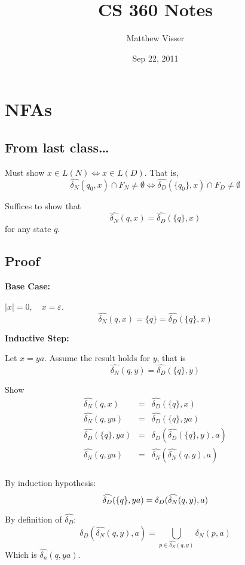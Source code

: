 \documentclass[12pt]{article}
\begin{document}
\renewcommand{\hat}{\widehat}

\title{CS 360 Notes}
\author{Matthew Visser}
\date{Sep 22, 2011}
\maketitle

\section{NFAs}
\subsection{From last class\dots}

Must show $x \in L(N) \iff x \in L(D)$. That is,
\[
\hat{\delta_N}(q_0,x)\cap F_N \neq \emptyset \iff \hat{\delta_D}(\{q_0\},x)\cap
F_D \neq \emptyset 
\]

Suffices to show that
\[
\hat{\delta_N}(q,x) = \hat{\delta_D}(\{q\},x)
\]
for any state $q$.

\subsection{Proof}

\textbf{Base Case:}

$|x| = 0,\quad x = \varepsilon$.
\[
\hat{\delta_N}(q,x) = \{q\} = \hat{\delta_D}(\{q\},x)
\]

\textbf{Inductive Step:}

Let $x = ya$. Assume the result holds for $y$, that is
\[
\hat{\delta_N}(q,y) = \hat{\delta_D}(\{q\},y)
\]

Show 
\begin{eqnarray*}
    \hat{\delta_N}(q,x) &=&  \hat{\delta_D}(\{q\},x)\\
    \hat{\delta_N}(q,ya) &=&  \hat{\delta_D}(\{q\},ya)\\
    \hat{\delta_D}(\{q\},ya) &=&  \delta_D(\hat{\delta_D}(\{q\},y), a)\\
    \hat{\delta_N}(q,ya) &=&  \hat{\delta_N}(\hat{\delta_N}(q,y), a)\\
\end{eqnarray*}

By induction hypothesis:
\[
\hat{\delta_D}(\{q\},ya) =  \delta_D(\hat{\delta_N}(q,y), a)\\
\]

By definition of $\hat{\delta_D}$:
\[
\delta_D(\hat{\delta_N}(q,y), a) = \bigcup_{p \in \hat{\delta_N}(q,y)}
\delta_N(p,a)
\]
Which is $\hat{\delta_n}(q,ya)$.
\end{document}
